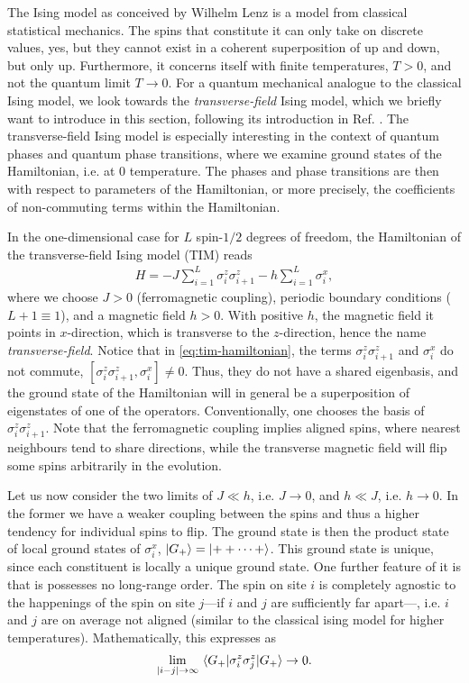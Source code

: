 The Ising model as conceived by Wilhelm Lenz is a model from classical
statistical mechanics. The spins that constitute it can only take on discrete
values, yes, but they cannot exist in a coherent superposition of up and down,
but only up. Furthermore, it concerns itself with finite temperatures, $T>0$,
and not the quantum limit $T\to 0$. 
For a quantum mechanical analogue to the classical Ising model, we
look towards the \emph{transverse-field} Ising model, which we briefly want to
introduce in this section, following its introduction in Ref.
\cite{langLectureNotesTopological2021}. The transverse-field Ising model is
especially interesting in the context of quantum phases and quantum phase
transitions, where we examine ground states of the Hamiltonian, i.e. at $0$
temperature. The phases and phase transitions are then with respect to
parameters of the Hamiltonian, or more precisely, the coefficients of
non-commuting terms within the Hamiltonian.

In the one-dimensional
case for $L$ spin-$1 /2$ degrees of freedom, the Hamiltonian of the
transverse-field Ising model (TIM) reads
\begin{align}\label{eq:tim-hamiltonian}
  H = -J\sum_{i=1}^L \sigma_i^z \sigma_{i+1}^z - h\sum_{i=1}^L \sigma_i^x
,\end{align}
where we choose $J>0$ (ferromagnetic coupling), periodic boundary conditions
($L+1 \equiv 1$), and a magnetic field $h>0$. With
positive $h$, the magnetic field it points in $x$-direction, which is transverse to the
$z$-direction, hence the name \emph{transverse-field}. 
Notice that in \cref{eq:tim-hamiltonian}, the terms $\sigma_i^z\sigma_{i+1}^z$
and $\sigma_i^x$ do not commute, $[\sigma_i^z\sigma_{i+1}^z,\sigma_i^x]\neq 0$.
Thus, they do not have a shared eigenbasis, and the ground state of the
Hamiltonian will in general be a superposition of eigenstates of one of the
operators. Conventionally, one chooses the basis of $\sigma_i^z\sigma_{i+1}^z$.
Note that the ferromagnetic coupling implies aligned spins, where nearest
neighbours tend to share directions, while the transverse magnetic field will
flip some spins arbitrarily in the evolution.

Let us now consider the two limits of $J \ll h$, i.e. $J\to 0$,  and $h \ll J$,
i.e. $h \to 0$. In the former we have a weaker coupling between the spins and
thus a higher tendency for individual spins to flip. The ground state is then
the product state of local ground states of $\sigma_i^x$, $\ket{G_+} =
\ket{++\cdots +}$. This ground state is unique, since each constituent is
locally a
unique ground state. One further feature of it is that is possesses no
long-range order. The spin on site $i$ is completely agnostic to the happenings
of the spin on site $j$---if $i$ and $j$ are sufficiently far apart---, i.e.
$i$ and $j$ are on
average not aligned (similar to the classical ising model for higher
temperatures). Mathematically, this expresses as 
\begin{align}
\lim_{\abs{i-j}\to\infty} \expval{\sigma_i^z\sigma_j^z}{G_+} \to 0
.\end{align}

